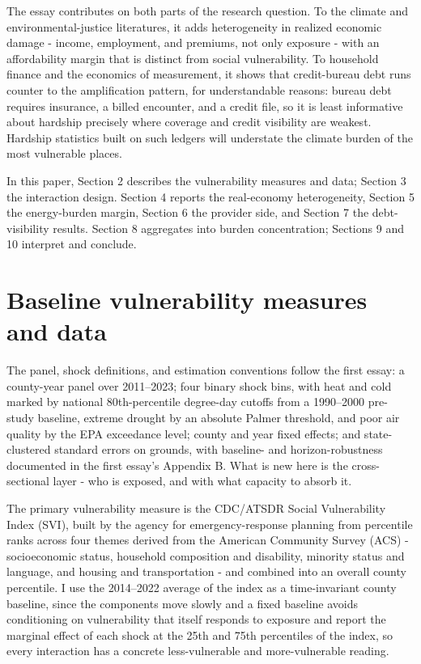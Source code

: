 \documentclass[a4paper,11pt]{report}
\begin{document}
The essay contributes on both parts of the research question. To the climate and environmental-justice literatures, it adds heterogeneity in realized economic damage - income, employment, and premiums, not only exposure - with an affordability margin that is distinct from social vulnerability. To household finance and the economics of measurement, it shows that credit-bureau debt runs counter to the amplification pattern, for understandable reasons: bureau debt requires insurance, a billed encounter, and a credit file, so it is least informative about hardship precisely where coverage and credit visibility are weakest. Hardship statistics built on such ledgers will understate the climate burden of the most vulnerable places.

In this paper, Section 2 describes the vulnerability measures and data; Section 3 the interaction design. Section 4 reports the real-economy heterogeneity, Section 5 the energy-burden margin, Section 6 the provider side, and Section 7 the debt-visibility results. Section 8 aggregates into burden concentration; Sections 9 and 10 interpret and conclude.

\FloatBarrier
\section{Baseline vulnerability measures and data}

The panel, shock definitions, and estimation conventions follow the first essay: a county-year panel over 2011--2023; four binary shock bins, with heat and cold marked by national 80th-percentile degree-day cutoffs from a 1990--2000 pre-study baseline, extreme drought by an absolute Palmer threshold, and poor air quality by the EPA exceedance level; county and year fixed effects; and state-clustered standard errors on \citet{abadie2023clustering} grounds, with baseline- and horizon-robustness documented in the first essay's Appendix B. What is new here is the cross-sectional layer - who is exposed, and with what capacity to absorb it.

The primary vulnerability measure is the CDC/ATSDR Social Vulnerability Index (SVI), built by the agency for emergency-response planning from percentile ranks across four themes derived from the American Community Survey (ACS) - socioeconomic status, household composition and disability, minority status and language, and housing and transportation - and combined into an overall county percentile. \citep{flanagan2011svi} I use the 2014--2022 average of the index as a time-invariant county baseline, since the components move slowly and a fixed baseline avoids conditioning on vulnerability that itself responds to exposure and report the marginal effect of each shock at the 25th and 75th percentiles of the index, so every interaction has a concrete less-vulnerable and more-vulnerable reading.
\end{document}
